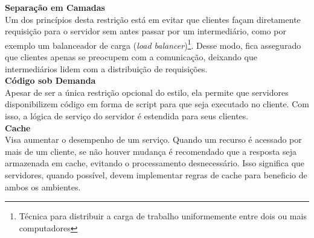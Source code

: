 \textbf{Separação em Camadas} \\

Um dos princípios desta restrição está em evitar que clientes façam diretamente requisição para o servidor sem antes passar por um intermediário, como por exemplo um balanceador de carga (\textit{load balancer})\footnote{
  Técnica para distribuir a carga de trabalho uniformemente entre dois ou mais computadores
}. Desse modo, fica assegurado que clientes apenas se preocupem com a comunicação, deixando que intermediários lidem com a distribuição de requisições. \cite{Fielding2000} \\

\textbf{Código sob Demanda} \\

Apesar de ser a única restrição opcional do estilo, ela permite que servidores disponibilizem código em forma de script para que seja executado no cliente. Com isso, a lógica de serviço do servidor é estendida para seus clientes. \cite{Fielding2000} \\

\textbf{Cache} \\

Visa aumentar o desempenho de um serviço. Quando um recurso é acessado por mais de um cliente, se não houver mudança é recomendado que a resposta seja armazenada em cache, evitando o processamento desnecessário. Isso significa que servidores, quando possível, devem implementar regras de cache para beneficio de ambos os ambientes. \cite{Fielding2000}
